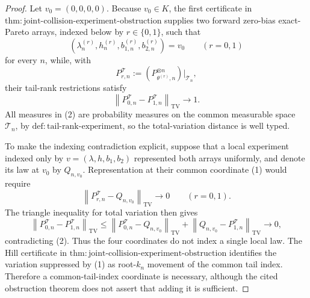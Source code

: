 \documentclass{article}
\begin{document}
\begin{proof}
Let \(v_0=(0,0,0,0)\).  Because \(v_0\in K\), the first certificate in \(\mathrm{thm{:}joint\text{-}collision\text{-}experiment\text{-}obstruction}\) supplies two forward zero-bias exact-Pareto arrays, indexed below by \(r\in\{0,1\}\), such that
\[
 (\lambda_n^{(r)},h_n^{(r)},b_{1,n}^{(r)},b_{2,n}^{(r)})=v_0
 \qquad(r=0,1)
 \tag{1}
\]
for every \(n\), while, with
\[
 P_{r,n}^{\mathcal T}
 :=(P_{\theta^{(r)},n}^{\otimes n})\big|_{\mathcal T_n},
\]
their tail-rank restrictions satisfy
\[
 \left\|P_{0,n}^{\mathcal T}-P_{1,n}^{\mathcal T}\right\|_{\mathrm{TV}}
 \longrightarrow1.
 \tag{2}
\]
All measures in (2) are probability measures on the common measurable space \(\mathcal T_n\), by \(\mathrm{def{:}tail\text{-}rank\text{-}experiment}\), so the total-variation distance is well typed.

To make the indexing contradiction explicit, suppose that a local experiment indexed only by \(v=(\lambda,h,b_1,b_2)\) represented both arrays uniformly, and denote its law at \(v_0\) by \(Q_{n,v_0}\).  Representation at their common coordinate (1) would require
\[
 \left\|P_{r,n}^{\mathcal T}-Q_{n,v_0}\right\|_{\mathrm{TV}}
 \longrightarrow0
 \qquad(r=0,1).
 \tag{3}
\]
The triangle inequality for total variation then gives
\[
 \left\|P_{0,n}^{\mathcal T}-P_{1,n}^{\mathcal T}\right\|_{\mathrm{TV}}
 \leq
 \left\|P_{0,n}^{\mathcal T}-Q_{n,v_0}\right\|_{\mathrm{TV}}
 +
 \left\|Q_{n,v_0}-P_{1,n}^{\mathcal T}\right\|_{\mathrm{TV}}
 \longrightarrow0,
 \tag{4}
\]
contradicting (2).  Thus the four coordinates do not index a single local law.  The Hill certificate in \(\mathrm{thm{:}joint\text{-}collision\text{-}experiment\text{-}obstruction}\) identifies the variation suppressed by (1) as root-\(k_n\) movement of the common tail index.  Therefore a common-tail-index coordinate is necessary, although the cited obstruction theorem does not assert that adding it is sufficient.


\end{proof}
\end{document}

